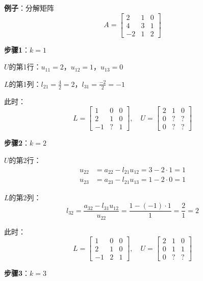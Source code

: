 \documentclass[12pt,a4paper]{article}
\begin{document}
\textbf{例子}：分解矩阵
\begin{equation}
A = \begin{bmatrix} 2 & 1 & 0 \\ 4 & 3 & 1 \\ -2 & 1 & 2 \end{bmatrix}
\end{equation}

\textbf{步骤1}：$k = 1$

$U$的第1行：$u_{11} = 2$，$u_{12} = 1$，$u_{13} = 0$

$L$的第1列：$l_{21} = \frac{4}{2} = 2$，$l_{31} = \frac{-2}{2} = -1$

此时：
\begin{equation}
L = \begin{bmatrix} 1 & 0 & 0 \\ 2 & 1 & 0 \\ -1 & ? & 1 \end{bmatrix}, \quad
U = \begin{bmatrix} 2 & 1 & 0 \\ 0 & ? & ? \\ 0 & ? & ? \end{bmatrix}
\end{equation}

\textbf{步骤2}：$k = 2$

$U$的第2行：
\begin{align}
u_{22} &= a_{22} - l_{21} u_{12} = 3 - 2 \cdot 1 = 1 \\
u_{23} &= a_{23} - l_{21} u_{13} = 1 - 2 \cdot 0 = 1
\end{align}

$L$的第2列：
\begin{equation}
l_{32} = \frac{a_{32} - l_{31} u_{12}}{u_{22}} = \frac{1 - (-1) \cdot 1}{1} = \frac{2}{1} = 2
\end{equation}

此时：
\begin{equation}
L = \begin{bmatrix} 1 & 0 & 0 \\ 2 & 1 & 0 \\ -1 & 2 & 1 \end{bmatrix}, \quad
U = \begin{bmatrix} 2 & 1 & 0 \\ 0 & 1 & 1 \\ 0 & ? & ? \end{bmatrix}
\end{equation}

\textbf{步骤3}：$k = 3$
\end{document}
